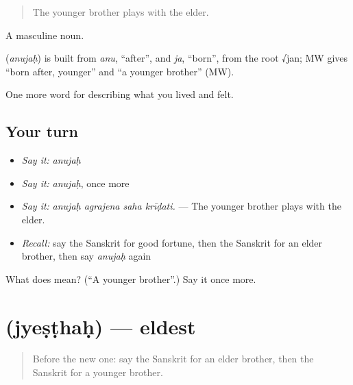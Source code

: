 \begin{quote}
The younger brother plays with the elder.
\end{quote}

A masculine noun.

\begin{cousinweb}
\textbf{} (\emph{anujaḥ}) is built from \emph{anu}, \textquotedblleft{}after\textquotedblright{}, and \emph{ja}, \textquotedblleft{}born\textquotedblright{}, from the root √jan; MW gives \textquotedblleft{}born after, younger\textquotedblright{} and \textquotedblleft{}a younger brother\textquotedblright{} (MW).
\end{cousinweb}

\begin{grammarlens}[title={What you've built}]
One more word for describing what you lived and felt.
\end{grammarlens}

\subsection*{Your turn}
\begin{itemize}
\raggedright
  \item \emph{Say it:} \emph{anujaḥ}
  \item \emph{Say it:} \emph{anujaḥ}, once more
  \item \emph{Say it:} \emph{anujaḥ agrajena saha krīḍati.} — The younger brother plays with the elder.
  \item \emph{Recall:} say the Sanskrit for good fortune, then the Sanskrit for an elder brother, then say \emph{anujaḥ} again
\end{itemize}

\begin{tcolorbox}[breakable,colback=teal!4,colframe=teal!35!black,title={Before you move on}]
What does  mean? (\textquotedblleft{}A younger brother\textquotedblright{}.) Say it once more.
\end{tcolorbox}
\section[\texorpdfstring{\sk{ज्येष्ठः} (jyeṣṭhaḥ)}{ज्येष्ठः (jyeṣṭhaḥ)}]{ (jyeṣṭhaḥ) — eldest}

\label{lesson:SA-C498-jyesthah}



\begin{quote}
Before the new one: say the Sanskrit for an elder brother, then the Sanskrit for a younger brother.
\end{quote}

